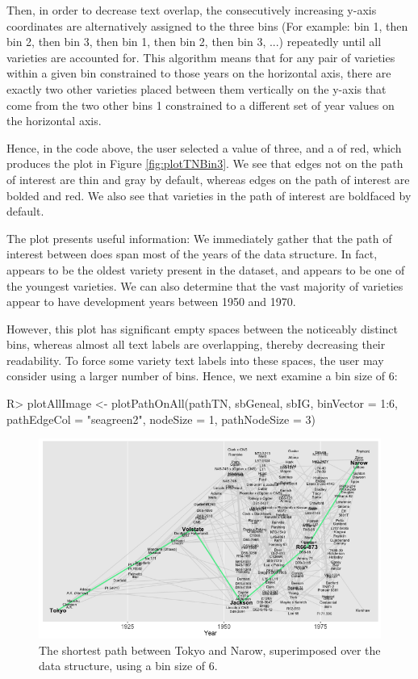 \documentclass[article,shortnames]{jss}
\begin{document}
Then, in order to decrease text overlap, the consecutively increasing y-axis coordinates are alternatively assigned to the three bins (For example: bin 1, then bin 2, then bin 3, then bin 1, then bin 2, then bin 3, ...) repeatedly until all varieties are accounted for. This algorithm means that for any pair of varieties within a given bin constrained to those years on the horizontal axis, there are exactly two other varieties placed between them vertically on the y-axis that come from the two other bins 1 constrained to a different set of year values on the horizontal axis.

Hence, in the code above, the user selected a  value of three, and a  of red, which produces the plot in Figure \ref{fig:plotTNBin3}. We see that edges not on the path of interest are thin and gray by default, whereas edges on the path of interest are bolded and red. We also see that varieties in the path of interest are boldfaced by default.

The plot presents useful information: We immediately gather that the path of interest between does span most of the years of the data structure. In fact,  appears to be the oldest variety present in the dataset, and  appears to be one of the youngest varieties. We can also determine that the vast majority of varieties appear to have development years between 1950 and 1970.

However, this plot has significant empty spaces between the noticeably distinct bins, whereas almost all text labels are overlapping, thereby decreasing their readability. To force some variety text labels into these spaces, the user may consider using a larger number of bins. Hence, we next examine a bin size of 6:

\begin{Code}
R> plotAllImage <- plotPathOnAll(pathTN, sbGeneal, sbIG, binVector = 1:6,
  pathEdgeCol = "seagreen2", nodeSize = 1, pathNodeSize = 3)
\end{Code}

\begin{figure}%
    \centering
    \includegraphics[width=\textwidth]{plotTNBin6}
    \caption{The shortest path between Tokyo and Narow, superimposed over the data structure, using a bin size of 6.}
    \label{fig:plotTNBin6}
\end{figure}
\end{document}
